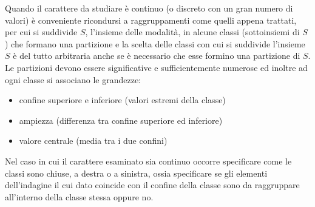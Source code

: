 \documentclass[a4paper,12pt, oneside]{book}
\begin{document}
Quando il carattere da studiare è continuo (o discreto con un gran numero di valori) è conveniente 
ricondursi a raggruppamenti come quelli appena trattati, per cui si suddivide $S$, l'insieme delle modalità,
in alcune classi (sottoinsiemi di $S$) che formano una partizione e la scelta delle classi con cui 
si suddivide l'insieme $S$ è del tutto arbitraria anche se è necessario che esse formino una partizione di $S$.\newline
Le partizioni devono essere significative e sufficientemente numerose ed inoltre ad ogni classe si associano le grandezze:
\begin{itemize}
\item confine superiore e inferiore (valori estremi della classe)
\item ampiezza (differenza tra confine superiore ed inferiore)
\item valore centrale (media tra i due confini)
\end{itemize}
Nel caso in cui il carattere esaminato sia continuo occorre specificare come le classi sono chiuse, a destra o a sinistra,
ossia specificare se gli elementi dell'indagine il cui dato coincide con il confine della classe sono da raggruppare
all'interno della classe stessa oppure no.
\end{document}
